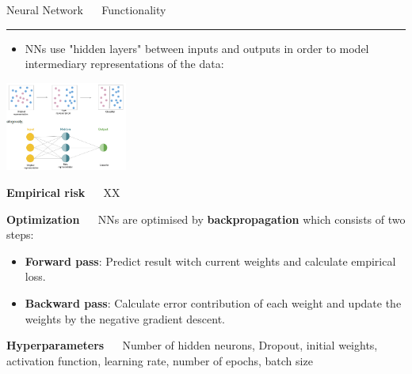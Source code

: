 \documentclass[11pt,compress,t,notes=noshow, xcolor=table]{beamer}
\begin{document}
\LARGE
\begin{frame}{\textcolor{gray!80}{Neural Network} ~~ Functionality}
\normalsize
\vspace{-0.5cm}
\noindent \textcolor{gray!80}{\rule{\textwidth}{1pt}}

\vspace{0.3cm}

\footnotesize

\begin{itemize}

\item NNs use "hidden layers" between inputs and outputs in order to model intermediary representations of the data: 

\end{itemize}



\medskip
  \centering
  \includegraphics[width=0.3\textwidth]{figure/nn_representation_learning.png}



\medskip



\textbf{\textcolor{gray!80}{Empirical risk}} ~~ XX

% 
%   
%   
% 
% 
 \medskip

\textbf{\textcolor{gray!80}{Optimization}} ~~ NNs are optimised by \textbf{backpropagation} which consists of two steps:
\begin{itemize}
  \item \textbf{Forward pass}: Predict result witch current weights and calculate empirical loss. 
  \item \textbf{Backward pass}: Calculate error contribution of each weight and update the weights by the negative gradient descent. 
\end{itemize}

\medskip

\textbf{\textcolor{gray!80}{Hyperparameters}} ~~ Number of hidden neurons, Dropout, initial weights, activation function, learning rate, number of epochs, batch size

\end{frame}
\end{document}
